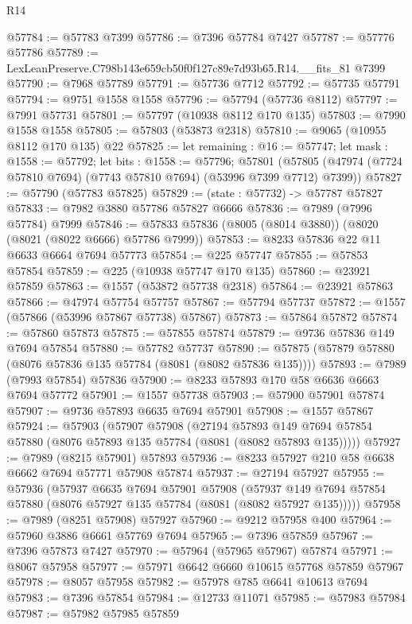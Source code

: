 \begin{lexlean}{R14}
\begin{coremodule}
@57784 := @57783 @7399
@57786 := @7396 @57784 @7427
@57787 := @57776 @57786
@57789 := LexLeanPreserve.C798b143e659cb50f0f127c89e7d93b65.R14.__fits_81 @7399
@57790 := @7968 @57789
@57791 := @57736 @7712
@57792 := @57735 @57791
@57794 := @9751 @1558 @1558
@57796 := @57794 (@57736 @8112)
@57797 := @7991 @57731
@57801 := @57797 (@10938 @8112 @170 @135)
@57803 := @7990 @1558 @1558
@57805 := @57803 (@53873 @2318)
@57810 := @9065 (@10955 @8112 @170 @135) @22
@57825 := let remaining : @16 := @57747;
  let mask : @1558 := @57792;
  let bits : @1558 := @57796;
  @57801 (@57805 (@47974 (@7724 @57810 @7694) (@7743 @57810 @7694) (@53996 @7399 @7712) @7399))
@57827 := @57790 (@57783 @57825)
@57829 := (state : @57732) -> @57787 @57827
@57833 := @7982 @3880 @57786 @57827 @6666
@57836 := @7989 (@7996 @57784) @7999
@57846 := @57833 @57836 (@8005 (@8014 @3880)) (@8020 (@8021 (@8022 @6666) @57786 @7999))
@57853 := @8233 @57836 @22 @11 @6633 @6664 @7694 @57773
@57854 := @225 @57747
@57855 := @57853 @57854
@57859 := @225 (@10938 @57747 @170 @135)
@57860 := @23921 @57859
@57863 := @1557 (@53872 @57738 @2318)
@57864 := @23921 @57863
@57866 := @47974 @57754 @57757
@57867 := @57794 @57737
@57872 := @1557 (@57866 (@53996 @57867 @57738) @57867)
@57873 := @57864 @57872
@57874 := @57860 @57873
@57875 := @57855 @57874
@57879 := @9736 @57836 @149 @7694 @57854
@57880 := @57782 @57737
@57890 := @57875 (@57879 @57880 (@8076 @57836 @135 @57784 (@8081 (@8082 @57836 @135))))
@57893 := @7989 (@7993 @57854) @57836
@57900 := @8233 @57893 @170 @58 @6636 @6663 @7694 @57772
@57901 := @1557 @57738
@57903 := @57900 @57901 @57874
@57907 := @9736 @57893 @6635 @7694 @57901
@57908 := @1557 @57867
@57924 := @57903
    (@57907
      @57908
      (@27194
        @57893
        @149
        @7694
        @57854
        @57880
        (@8076 @57893 @135 @57784 (@8081 (@8082 @57893 @135)))))
@57927 := @7989 (@8215 @57901) @57893
@57936 := @8233 @57927 @210 @58 @6638 @6662 @7694 @57771 @57908 @57874
@57937 := @27194 @57927
@57955 := @57936
    (@57937
      @6635
      @7694
      @57901
      @57908
      (@57937 @149 @7694 @57854 @57880 (@8076 @57927 @135 @57784 (@8081 (@8082 @57927 @135)))))
@57958 := @7989 (@8251 @57908) @57927
@57960 := @9212 @57958 @400
@57964 := @57960 @3886 @6661 @57769 @7694
@57965 := @7396 @57859
@57967 := @7396 @57873 @7427
@57970 := @57964 (@57965 @57967) @57874
@57971 := @8067 @57958
@57977 := @57971 @6642 @6660 @10615 @57768 @57859 @57967
@57978 := @8057 @57958
@57982 := @57978 @785 @6641 @10613 @7694
@57983 := @7396 @57854
@57984 := @12733 @11071
@57985 := @57983 @57984
@57987 := @57982 @57985 @57859

\end{coremodule}
\end{lexlean}
